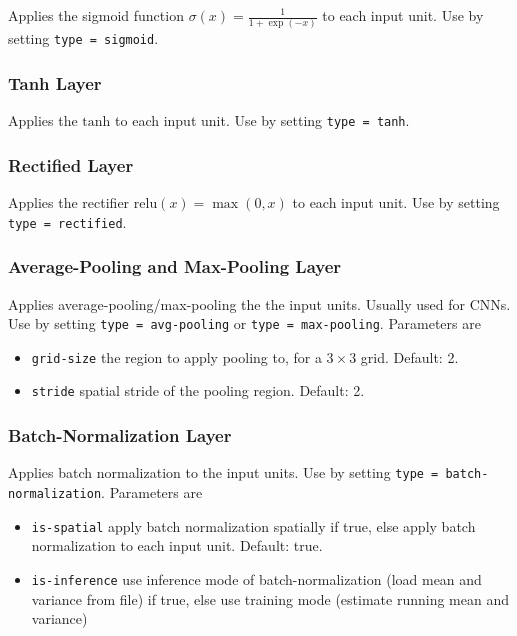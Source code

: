Applies the sigmoid function $ \sigma(x) = \frac{1}{1+\exp(-x)} $ to each input unit. Use by setting \texttt{type = sigmoid}.

\subsubsection*{Tanh Layer}

Applies the $ \mathrm{tanh} $ to each input unit. Use by setting \texttt{type = tanh}.

\subsubsection*{Rectified Layer}

Applies the rectifier $ \mathrm{relu}(x) = \max(0, x) $ to each input unit. Use by setting \texttt{type = rectified}.

\subsubsection*{Average-Pooling and Max-Pooling Layer}

Applies average-pooling/max-pooling the the input units. Usually used for CNNs. Use by setting \texttt{type = avg-pooling} or \texttt{type = max-pooling}. Parameters are
\begin{itemize}
    \item \texttt{grid-size} the region to apply pooling to,  for a $ 3 \times 3 $ grid. Default: 2.
    \item \texttt{stride} spatial stride of the pooling region. Default: 2.
\end{itemize}

\subsubsection*{Batch-Normalization Layer}

Applies batch normalization to the input units. Use by setting \texttt{type = batch-normalization}. Parameters are
\begin{itemize}
    \item \texttt{is-spatial} apply batch normalization spatially if true, else apply batch normalization to each input unit. Default: true.
    \item \texttt{is-inference} use inference mode of batch-normalization (load mean and variance from file) if true, else use training mode (estimate running mean and variance)
\end{itemize}

